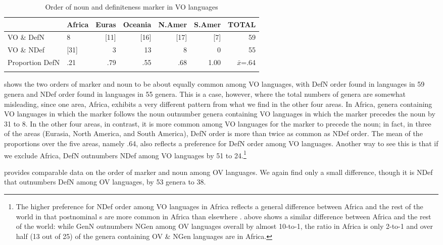 \documentclass[output=paper]{langsci/langscibook}
\begin{document}
\begin{table}
\begin{tabularx}{\textwidth}{llrrrrr} 
\lsptoprule
& \bfseries Africa & \bfseries Euras & \bfseries Oceania & \bfseries N.Amer & \bfseries S.Amer & \bfseries TOTAL\\
\midrule
VO \& DefN & 8 & [11] & [16] & [17] & [7] & 59\\
VO \& NDef & [31] & 3 & 13 & 8 & 0 & 55\\
Proportion DefN & .21 & .79 & .55 & .68 & 1.00 & $\bar{x}$=.64\\
\lspbottomrule
\end{tabularx}
\caption{\label{tab:dryer:8}Order of noun and definiteness marker in VO languages} 
\end{table}

 shows the two orders of  marker and noun to be about equally common among VO languages, with DefN order found in languages in 59 genera and NDef order found in languages in 55 genera. This is a case, however, where the total numbers of genera are somewhat misleading, since one area, Africa, exhibits a very different pattern from what we find in the other four areas. In Africa, genera containing VO languages in which the  marker follows the noun outnumber genera containing VO languages in which the  marker precedes the noun by 31 to 8. In the other four areas, in contrast, it is more common among VO languages for the  marker to precede the noun; in fact, in three of the areas (Eurasia, North America, and South America), DefN order is more than twice as common as NDef order. The mean of the proportions over the five areas, namely .64, also reflects a preference for DefN order among VO languages. Another way to see this is that if we exclude Africa, DefN outnumbers NDef among VO languages by 51 to 24.\footnote{The higher preference for NDef order among VO languages in Africa reflects a general difference between Africa and the rest of the world in that postnominal s are more common in Africa than elsewhere \citep{Dryer2010}.  above shows a similar difference between Africa and the rest of the world: while GenN outnumbers NGen among OV languages overall by almost 10-to-1, the ratio in Africa is only 2-to-1 and over half (13 out of 25) of the genera containing OV \& NGen languages are in Africa.}

 provides comparable data on the order of  marker and noun among OV languages.  We again find only a small difference, though it is NDef that outnumbers DefN among OV languages, by 53 genera to 38.
\end{document}
